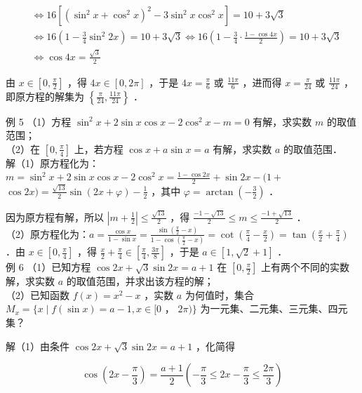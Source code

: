 \documentclass[10pt]{article}
\begin{document}
\[
\begin{aligned}
& \Leftrightarrow 16\left[\left(\sin ^{2} x+\cos ^{2} x\right)^{2}-3 \sin ^{2} x \cos ^{2} x\right]=10+3 \sqrt{3} \\
& \Leftrightarrow 16\left(1-\frac{3}{4} \sin ^{2} 2 x\right)=10+3 \sqrt{3} \Leftrightarrow 16\left(1-\frac{3}{4} \cdot \frac{1-\cos 4 x}{2}\right)=10+3 \sqrt{3} \\
& \Leftrightarrow \cos 4 x=\frac{\sqrt{3}}{2}
\end{aligned}
\]

由 \(x \in\left[0, \frac{\pi}{2}\right]\) ，得 \(4 x \in[0,2 \pi]\) ，于是 \(4 x=\frac{\pi}{6}\) 或 \(\frac{11 \pi}{6}\) ，进而得 \(x=\frac{\pi}{24}\) 或 \(\frac{11 \pi}{24}\) ，即原方程的解集为 \(\left\{\frac{\pi}{24}, \frac{11 \pi}{24}\right\}\) ．

例 5 （1）方程 \(\sin ^{2} x+2 \sin x \cos x-2 \cos ^{2} x-m=0\) 有解，求实数 \(m\) 的取值范围；\\
（2）在 \(\left[0, \frac{\pi}{4}\right]\) 上，若方程 \(\cos x+a \sin x=a\) 有解，求实数 \(a\) 的取值范围．\\
解（1）原方程化为：\(m=\sin ^{2} x+2 \sin x \cos x-2 \cos ^{2} x=\frac{1-\cos 2 x}{2}+\sin 2 x-(1+\) \(\cos 2 x)=\frac{\sqrt{13}}{2} \sin (2 x+\varphi)-\frac{1}{2}\) ，其中 \(\varphi=\arctan \left(-\frac{3}{2}\right)\) ．

因为原方程有解，所以 \(\left|m+\frac{1}{2}\right| \leqslant \frac{\sqrt{13}}{2}\) ，得 \(\frac{-1-\sqrt{13}}{2} \leqslant m \leqslant \frac{-1+\sqrt{13}}{2}\) ．\\
（2）原方程化为：\(a=\frac{\cos x}{1-\sin x}=\frac{\sin \left(\frac{\pi}{2}-x\right)}{1-\cos \left(\frac{\pi}{2}-x\right)}=\cot \left(\frac{\pi}{4}-\frac{x}{2}\right)=\tan \left(\frac{x}{2}+\frac{\pi}{4}\right)\) ．由 \(x \in\left[0, \frac{\pi}{4}\right]\) ，得 \(\frac{x}{2}+\frac{\pi}{4} \in\left[\frac{\pi}{4}, \frac{3 \pi}{8}\right]\) ，于是 \(a \in[1, \sqrt{2}+1]\) ．\\
例 6 （1）已知方程 \(\cos 2 x+\sqrt{3} \sin 2 x=a+1\) 在 \(\left[0, \frac{\pi}{2}\right]\) 上有两个不同的实数解，求实数 \(a\) 的取值范围，并求出该方程的解；\\
（2）已知函数 \(f(x)=x^{2}-x\) ，实数 \(a\) 为何值时，集合 \(M_{x}=\{x \mid f(\sin x)=a-1, x \in[0\) ， \(2 \pi)\}\) 为一元集、二元集、三元集、四元集？

解（1）由条件 \(\cos 2 x+\sqrt{3} \sin 2 x=a+1\) ，化简得

\[
\cos \left(2 x-\frac{\pi}{3}\right)=\frac{a+1}{2}\left(-\frac{\pi}{3} \leqslant 2 x-\frac{\pi}{3} \leqslant \frac{2 \pi}{3}\right)
\]
\end{document}
